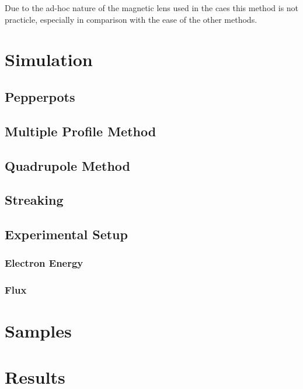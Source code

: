 Due to the ad-hoc nature of the magnetic lens used in the \gls{caes} this method is not practicle, especially in comparison with the ease of the other methods.

\section{Simulation}



\subsection{Pepperpots}

\subsection{Multiple Profile Method}

\subsection{Quadrupole Method}

\subsection{Streaking}

\subsection{Experimental Setup}

\subsubsection{Electron Energy}

\subsubsection{Flux}

\section{Samples}

\section{Results}
